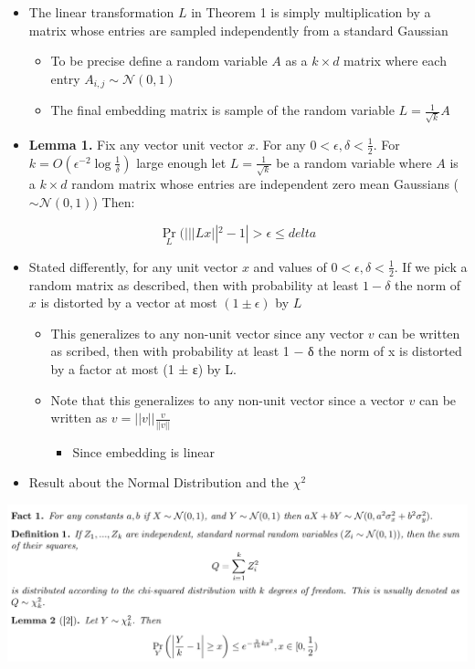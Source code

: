 \documentclass[11pt]{article}
\begin{document}
\begin{itemize}
\item The linear transformation \(L\) in Theorem 1 is simply multiplication by a matrix whose entries are sampled independently from a standard Gaussian
\begin{itemize}
\item To be precise define a random variable \(A\) as a \(k \times d\) matrix where each entry \(A_{i,j} \sim \mathcal N(0,1)\)
\item The final embedding matrix is sample of the random variable \(L= \frac1{\sqrt k} A\)
\end{itemize}

\item \textbf{Lemma 1.} Fix any vector unit vector \(x\). For any \(0 < \epsilon, \delta < \frac12\). For \(k = O(\epsilon ^{-2}\log \frac1\delta)\) large enough let \(L = \frac1{\sqrt k}\) be a random variable where \(A\) is a \(k \times d\) random matrix whose entries are independent zero mean Gaussians (\(\sim \mathcal N(0,1)\)) Then:
\end{itemize}
\begin{equation}
	\Pr_L(|||Lx||^2 - 1| > \epsilon \leq delta
\end{equation}
\begin{itemize}
\item Stated differently, for any unit vector \(x\) and values of \(0 < \epsilon, \delta < \frac12\). If we pick a random matrix as described, then with probability at least \(1- \delta\) the norm of \(x\) is distorted by a vector at most \((1 \pm \epsilon)\) by \(L\)
\begin{itemize}
\item This generalizes to any non-unit vector since any vector \(v\) can be written as scribed, then with probability at least 1 − δ the norm of x is distorted by a factor at most (1 ± ε) by L.
\item Note that this generalizes to any non-unit vector since a vector \(v\) can be written as \(v = ||v|| \frac{v}{||v||}\)
\begin{itemize}
\item Since embedding is linear
\end{itemize}
\end{itemize}

\item Result about the Normal Distribution and the \(\chi^2\)
\end{itemize}
\begin{center}
\includegraphics[width=.9\linewidth]{Johnson-Lindenstrauss Dimensionality Reduction/screenshot_2018-11-18_13-16-48.png}
\end{center}
\end{document}
